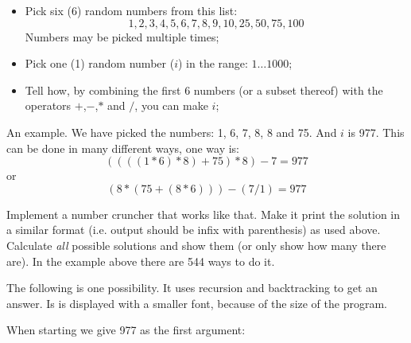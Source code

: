 \begin{Exercise}[title={Number cruncher},difficulty=9]
\label{ex:numbercruncher}
\begin{itemize}
\item{Pick six (6) random numbers from this list:
$$1, 2, 3, 4, 5, 6, 7, 8, 9, 10, 25, 50, 75, 100$$
Numbers may be picked multiple times;}
\item{Pick one (1) random number ($i$) in the range: $1 \ldots 1000$;}
\item{Tell how, by combining the first 6 numbers (or a subset thereof)
with the operators $+$,$-$,$*$ and $/$, you can make $i$;}
\end{itemize}
An example. We have picked the numbers: 1, 6, 7, 8, 8 and 75. And $i$ is
977. This can be done in many different ways, one way is:
$$ ((((1 * 6) * 8) + 75) * 8) - 7 = 977$$ 
or
$$ (8*(75+(8*6)))-(7/1) = 977$$

\Question\label{ex:cruncher q1}
Implement a number cruncher that works like that. Make it print the
solution in a similar format (i.e. output should be infix with
parenthesis) as used above.
\Question\label{ex:cruncher q2}
Calculate \emph{all} possible solutions and show them (or only show how
many there are). In the example above there are 544 ways to do it.
\end{Exercise}

\begin{Answer}
\Question 
The following is one possibility. It uses recursion and backtracking to get
an answer. Is is displayed with a smaller font, because of the size of
the program.


\Question
When starting  we give 977 as the first argument:
\vspace{1em}

\end{Answer}
